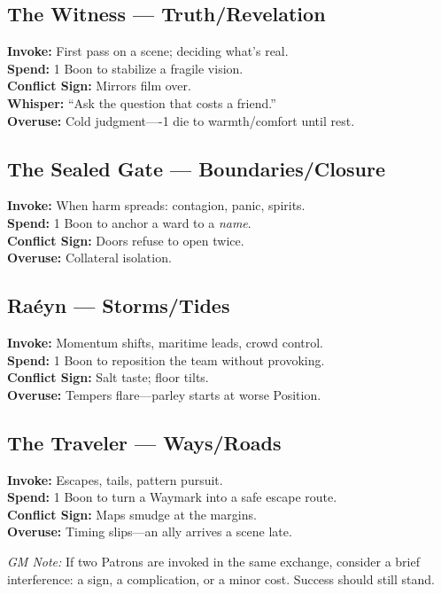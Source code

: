 \documentclass[11pt]{article}
\begin{document}
\subsection*{The Witness --- Truth/Revelation}
\textbf{Invoke:} First pass on a scene; deciding what's real.\\
\textbf{Spend:} 1 Boon to stabilize a fragile vision.\\
\textbf{Conflict Sign:} Mirrors film over.\\
\textbf{Whisper:} ``Ask the question that costs a friend.''\\
\textbf{Overuse:} Cold judgment----1 die to warmth/comfort until rest.

\subsection*{The Sealed Gate --- Boundaries/Closure}
\textbf{Invoke:} When harm spreads: contagion, panic, spirits.\\
\textbf{Spend:} 1 Boon to anchor a ward to a \emph{name}.\\
\textbf{Conflict Sign:} Doors refuse to open twice.\\
\textbf{Overuse:} Collateral isolation.

\subsection*{Raéyn --- Storms/Tides}
\textbf{Invoke:} Momentum shifts, maritime leads, crowd control.\\
\textbf{Spend:} 1 Boon to reposition the team without provoking.\\
\textbf{Conflict Sign:} Salt taste; floor tilts.\\
\textbf{Overuse:} Tempers flare---parley starts at worse Position.

\subsection*{The Traveler --- Ways/Roads}
\textbf{Invoke:} Escapes, tails, pattern pursuit.\\
\textbf{Spend:} 1 Boon to turn a Waymark into a safe escape route.\\
\textbf{Conflict Sign:} Maps smudge at the margins.\\
\textbf{Overuse:} Timing slips---an ally arrives a scene late.

\medskip
\noindent
\emph{GM Note:} If two Patrons are invoked in the same exchange, consider a brief interference: a sign, a complication, or a minor cost. Success should still stand.

\end{document}
